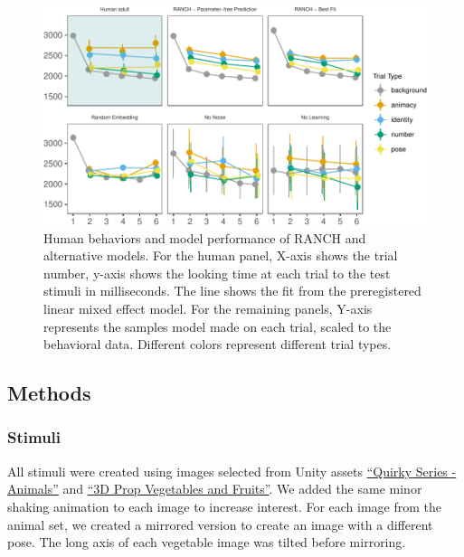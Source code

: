 \documentclass[10pt, letterpaper]{article}
\newenvironment{CodeChunk}{}{}
\begin{document}
\begin{CodeChunk}
\begin{figure}[h!]

{\centering \includegraphics{figs/lol-1} 

}

\caption[Human behaviors and model performance of RANCH and alternative models]{Human behaviors and model performance of RANCH and alternative models. For the human panel, X-axis shows the trial number, y-axis shows the looking time at each trial to the test stimuli in milliseconds. The line shows the fit from the preregistered linear mixed effect model. For the remaining panels, Y-axis represents the samples model made on each trial, scaled to the behavioral data. Different colors represent different trial types.}\label{fig:lol}
\end{figure}
\end{CodeChunk}

\hypertarget{methods}{%
\subsection{Methods}\label{methods}}

\hypertarget{stimuli}{%
\subsubsection{Stimuli}\label{stimuli}}

All stimuli were created using images selected from Unity assets
\href{https://assetstore.unity.com/packages/3d/characters/animals/quirky-series-animals-mega-pack-vol-2-183280}{``Quirky
Series - Animals''} and
\href{https://assetstore.unity.com/packages/3d/props/food/3d-prop-vegetables-and-fruits-237790}{``3D
Prop Vegetables and Fruits''}. We added the same minor shaking animation
to each image to increase interest. For each image from the animal set,
we created a mirrored version to create an image with a different pose.
The long axis of each vegetable image was tilted before mirroring.
\end{document}

